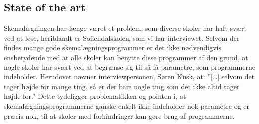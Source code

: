 \subsection{State of the art}
Skemalægningen har længe været et problem, som diverse skoler har haft svært ved at løse, heriblandt er Sofiendalskolen, som vi har interviewet.
Selvom der findes mange gode skemalægningsprogrammer er det ikke nødvendigvis ensbetydende med at alle skoler kan benytte disse programmer af den grund, at nogle skoler har svært ved at begrænse sig til så få parametre, som programmerne indeholder. Herudover nævner interviewpersonen, Søren Kusk, at: ”[…] selvom det tager højde for mange ting, så er der bare nogle ting som det ikke altid tager højde for\cite{biblop1:19}.” Dette tydeliggør problematikken og pointen i, at skemalægningsprogrammerne ganske enkelt ikke indeholder nok parametre og er præcis nok, til at skoler med forhindringer kan gøre brug af programmerne. 